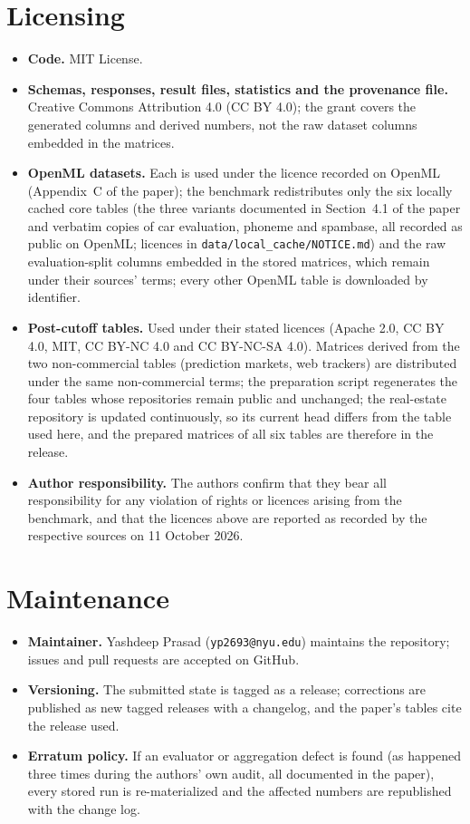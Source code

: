 \documentclass[11pt]{article}
\begin{document}
\section*{Licensing}
\begin{itemize}
\item \textbf{Code.} MIT License.
\item \textbf{Schemas, responses, result files, statistics and the provenance file.} Creative Commons Attribution 4.0 (CC BY 4.0); the grant covers the generated columns and derived numbers, not the raw dataset columns embedded in the matrices.
\item \textbf{OpenML datasets.} Each is used under the licence recorded on OpenML (Appendix~C of the paper); the benchmark redistributes only the six locally cached core tables (the three variants documented in Section~4.1 of the paper and verbatim copies of car evaluation, phoneme and spambase, all recorded as public on OpenML; licences in \texttt{data/local\_cache/NOTICE.md}) and the raw evaluation-split columns embedded in the stored matrices, which remain under their sources' terms; every other OpenML table is downloaded by identifier.
\item \textbf{Post-cutoff tables.} Used under their stated licences (Apache 2.0, CC BY 4.0, MIT, CC BY-NC 4.0 and CC BY-NC-SA 4.0). Matrices derived from the two non-commercial tables (prediction markets, web trackers) are distributed under the same non-commercial terms; the preparation script regenerates the four tables whose repositories remain public and unchanged; the real-estate repository is updated continuously, so its current head differs from the table used here, and the prepared matrices of all six tables are therefore in the release.
\item \textbf{Author responsibility.} The authors confirm that they bear all responsibility for any violation of rights or licences arising from the benchmark, and that the licences above are reported as recorded by the respective sources on 11 October 2026.
\end{itemize}

\section*{Maintenance}
\begin{itemize}
\item \textbf{Maintainer.} Yashdeep Prasad (\texttt{yp2693@nyu.edu}) maintains the repository; issues and pull requests are accepted on GitHub.
\item \textbf{Versioning.} The submitted state is tagged as a release; corrections are published as new tagged releases with a changelog, and the paper's tables cite the release used.
\item \textbf{Erratum policy.} If an evaluator or aggregation defect is found (as happened three times during the authors' own audit, all documented in the paper), every stored run is re-materialized and the affected numbers are republished with the change log.
\end{itemize}
\end{document}
